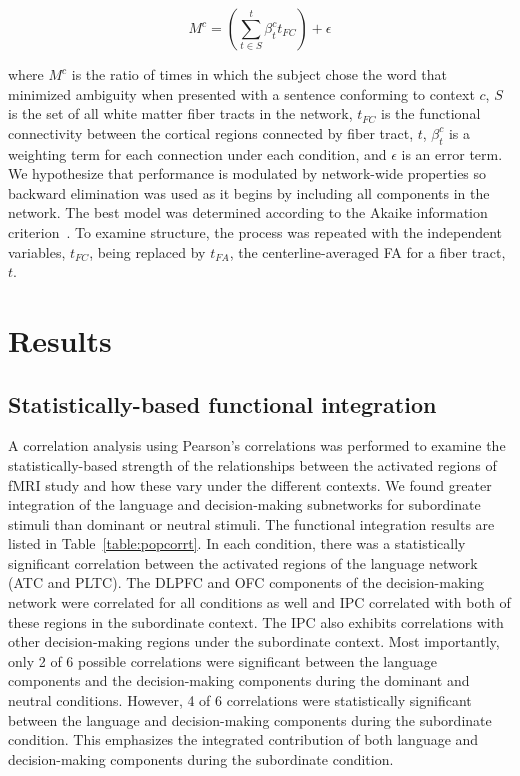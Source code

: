 \documentclass[final,authoryear,5p,times,twocolumn]{elsarticle}
\begin{document}
\begin{equation}
M^{c} = \left( \sum^{t}_{t \in S} \beta_{t}^{c} t_{FC} \right) + \epsilon
\end{equation}

where $M^{c}$ is the ratio of times in which the subject chose the word that minimized ambiguity when presented with a sentence conforming to context $c$, $S$ is the set of all white matter fiber tracts in the network, $t_{FC}$ is the functional connectivity between the cortical regions connected by fiber tract, $t$, $\beta_{t}^{c}$ is a weighting term for each connection under each condition, and $\epsilon$ is an error term. We hypothesize that performance is modulated by network-wide properties so backward elimination was used as it begins by including all components in the network. The best model was determined according to the Akaike information criterion~\citep{Akaike1974}. To examine structure, the process was repeated with the independent variables, $t_{FC}$, being replaced by $t_{FA}$, the centerline-averaged FA for a fiber tract, $t$.

\section{Results}

\subsection{Statistically-based functional integration}
A correlation analysis using Pearson's correlations was performed to examine the statistically-based strength of the relationships between the activated regions of fMRI study and how these vary under the different contexts. We found greater integration of the language and decision-making subnetworks for subordinate stimuli than dominant or neutral stimuli. The functional integration results are listed in Table~\ref{table:popcorrt}. In each condition, there was a statistically significant correlation between the activated regions of the language network (ATC and PLTC). The DLPFC and OFC components of the decision-making network were correlated for all conditions as well and IPC correlated with both of these regions in the subordinate context. The IPC also exhibits correlations with other decision-making regions under the subordinate context. Most importantly, only 2 of 6 possible correlations were significant between the language components and the decision-making components during the dominant and neutral conditions. However, 4 of 6 correlations were statistically significant between the language and decision-making components during the subordinate condition. This emphasizes the integrated contribution of both language and decision-making components during the subordinate condition. 
\end{document}
